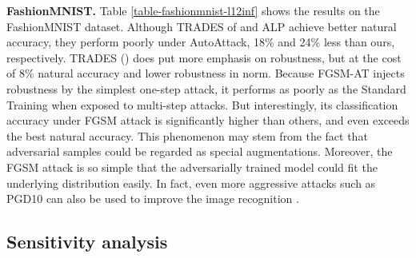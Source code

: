 \documentclass[preprint,review,12pt]{elsarticle}
\numberwithin{equation}{section}
\begin{document}
\textbf{FashionMNIST.} Table \ref{table-fashionmnist-l12inf}  shows the results on the FashionMNIST dataset.
Although TRADES of  and ALP achieve  better natural accuracy,
they perform poorly under AutoAttack, 18\% and 24\% less than ours, respectively.
TRADES () does put more emphasis on robustness,
but at the cost of 8\% natural accuracy and lower robustness in  norm.
Because FGSM-AT injects robustness by the simplest one-step attack,
it performs as poorly as the Standard Training when exposed to multi-step attacks.
But interestingly, its classification accuracy under FGSM attack
is significantly higher than others, and even exceeds the best natural accuracy.
This phenomenon may stem from the fact that adversarial samples could be regarded as special augmentations.
Moreover, the FGSM attack is so simple that the adversarially trained model could fit the underlying distribution easily.
In fact, even more aggressive attacks such as PGD10 can also be used to improve the image recognition \cite{xie2020}.



\subsection{Sensitivity analysis}



\begin{table}[htb]
	\center
	\caption{Comparison of classification accuracy (\%) across different hyperparameters  and  on CIFAR-10.}
	\label{table-ablation}
\end{table}
\end{document}

